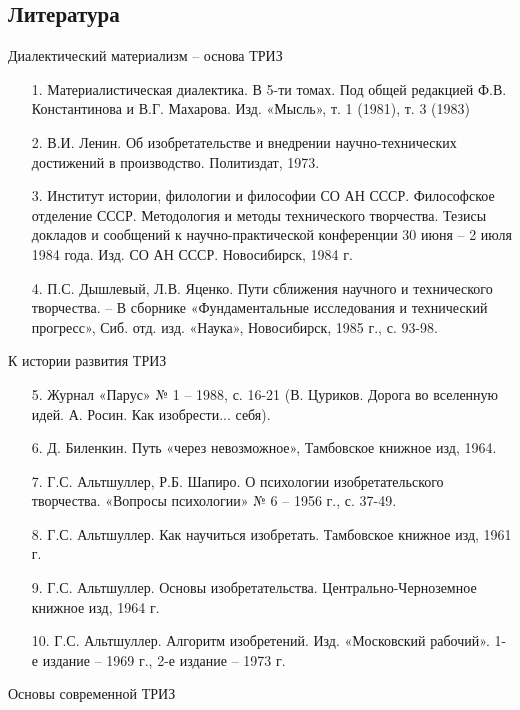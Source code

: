 \documentclass[11pt,a4paper]{article}
\begin{document}
\subsection{Литература}

Диалектический материализм -- основа ТРИЗ
\begin{itemize}
\item[1.] Материалистическая диалектика. В 5-ти томах. Под общей редакцией
  Ф.В. Константинова и В.Г. Махарова. Изд. «Мысль», т. 1 (1981), т. 3 (1983)
\item[2.] В.И. Ленин. Об изобретательстве и внедрении научно-технических
  достижений в производство. Политиздат, 1973.
\item[3.] Институт истории, филологии и философии СО АН СССР. Философское
  отделение СССР. Методология и методы технического творчества. Тезисы
  докладов и сообщений к научно-практической конференции 30 июня -- 2 июля
  1984 года. Изд. СО АН СССР. Новосибирск, 1984 г.
\item[4.] П.С. Дышлевый, Л.В. Яценко. Пути сближения научного и технического
  творчества. -- В сборнике «Фундаментальные исследования и технический
  прогресс», Сиб. отд. изд. «Наука», Новосибирск, 1985 г., с. 93-98.
\end{itemize}
К истории развития ТРИЗ
\begin{itemize}
\item[5.] Журнал «Парус» № 1 -- 1988, с. 16-21 (В. Цуриков. Дорога во
  вселенную идей. А. Росин. Как изобрести... себя).
\item[6.] Д. Биленкин. Путь «через невозможное», Тамбовское книжное изд, 1964.
\item[7.] Г.С. Альтшуллер, Р.Б. Шапиро. О психологии изобретательского
  творчества. «Вопросы психологии» № 6 -- 1956 г., с. 37-49.
\item[8.] Г.С. Альтшуллер. Как научиться изобретать. Тамбовское книжное изд,
  1961 г.
\item[9.] Г.С. Альтшуллер. Основы изобретательства. Центрально-Черноземное
  книжное изд, 1964 г.
\item[10.] Г.С. Альтшуллер. Алгоритм изобретений. Изд. «Московский рабочий».
  1-е издание -- 1969 г., 2-е издание -- 1973 г.
\end{itemize}
Основы современной ТРИЗ
\end{document}
